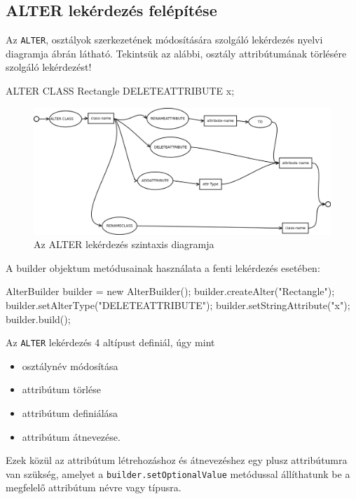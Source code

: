 \subsection{ALTER lekérdezés felépítése}

Az \texttt{ALTER}, osztályok szerkezetének módosítására szolgáló lekérdezés nyelvi diagramja  ábrán látható. Tekintsük az alábbi, osztály attribútumának törlésére szolgáló lekérdezést!
\begin{sql}
ALTER CLASS Rectangle DELETEATTRIBUTE x;
\end{sql}

\begin{figure}[htb]
	\begin{center}
		\includegraphics[scale=0.4]{images/alter}
		\caption{Az ALTER lekérdezés szintaxis diagramja}
		\label{fig:alterSytnax}
	\end{center}
\end{figure}

A builder objektum metódusainak használata a fenti lekérdezés esetében:

\begin{java}
AlterBuilder builder = new AlterBuilder();
builder.createAlter("Rectangle");
builder.setAlterType("DELETEATTRIBUTE");
builder.setStringAttribute("x");
builder.build();
\end{java}

Az \texttt{ALTER} lekérdezés 4 altípust definiál, úgy mint

\begin{itemize}
\item osztálynév módosítása
\item attribútum törlése
\item attribútum definiálása
\item attribútum átnevezése.
\end{itemize}

Ezek közül az attribútum létrehozáshoz és átnevezéshez egy plusz attribútumra van szükség, amelyet a \texttt{builder.setOptionalValue} metódussal állíthatunk be a megfelelő attribútum névre vagy típusra.

